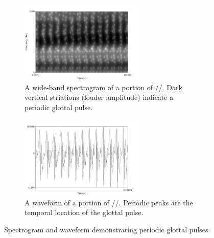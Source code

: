 \begin{figure}[H]
\centering
\begin{subfigure}{0.75\textwidth}
\centering
\includegraphics[width=0.65\textwidth]{figure/glot-spect.png}
\caption{A wide-band spectrogram of a portion of //. Dark vertical striations (louder amplitude) indicate a periodic glottal pulse.}\label{fig:glot-spect}
\end{subfigure}
\begin{subfigure}{0.75\textwidth}
\centering
\includegraphics[width=0.65\textwidth]{figure/glot-wav.png}
\caption{A waveform of a portion of //.  Periodic peaks are the temporal location of the glottal pulse.}\label{fig:glot-wav}
\end{subfigure}
\caption{Spectrogram and waveform demonstrating periodic glottal pulses.}\label{fig:glot-puls}
\end{figure}

